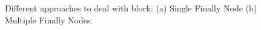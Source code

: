 \begin{figure}[!ht]
\begin{center}
\caption{Different approaches to deal with  block:
(a) Single Finally Node (b) Multiple Finally
Nodes.}\label{fig-finally}
\end{center}
\end{figure}

